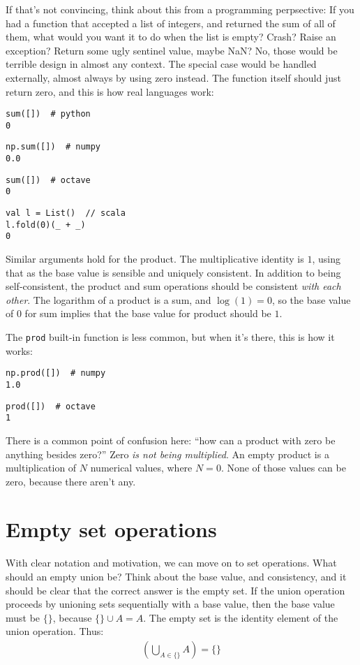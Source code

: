 \documentclass{article}
\begin{document}
If that's not convincing, think about this from a programming perpsective: If you had a function that accepted a list of integers, and returned the sum of all of them, what would you want it to do when the list is empty? Crash? Raise an exception? Return some ugly sentinel value, maybe NaN? No, those would be terrible design in almost any context. The special case would be handled externally, almost always by using zero instead. The function itself should just return zero, and this is how real languages work:
\begin{verbatim}
sum([])  # python
0
\end{verbatim}
\begin{verbatim}
np.sum([])  # numpy
0.0
\end{verbatim}
\begin{verbatim}
sum([])  # octave
0
\end{verbatim}
\begin{verbatim}
val l = List()  // scala
l.fold(0)(_ + _)
0
\end{verbatim}

Similar arguments hold for the product. The multiplicative identity is $1$, using that as the base value is sensible and uniquely consistent. In addition to being self-consistent, the product and sum operations should be consistent \textit{with each other}. The logarithm of a product is a sum, and $\log(1) = 0$, so the base value of $0$ for sum implies that the base value for product should be $1$.

The \texttt{prod} built-in function is less common, but when it's there, this is how it works:

\begin{verbatim}
np.prod([])  # numpy
1.0
\end{verbatim}
\begin{verbatim}
prod([])  # octave
1
\end{verbatim}

There is a common point of confusion here: ``how can a product with zero be anything besides zero?'' Zero \textit{is not being multiplied}. An empty product is a multiplication of $N$ numerical values, where $N=0$. None of those values can be zero, because there aren't any.

\section{Empty set operations}
With clear notation and motivation, we can move on to set operations. What should an empty union be? Think about the base value, and consistency, and it should be clear that the correct answer is the empty set. If the union operation proceeds by unioning sets sequentially with a base value, then the base value must be $\{\}$, because $\{\} \cup A = A$. The empty set is the identity element of the union operation. Thus:
\begin{align} 
\left(\bigcup\limits_{A \in \{\}} A\right) = \{\}
\end{align}
\end{document}
